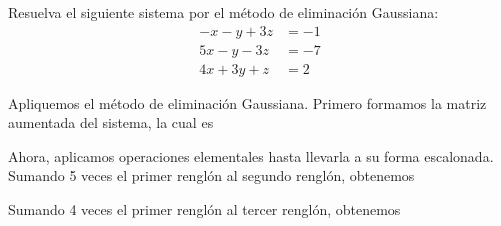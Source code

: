 \begin{examplebox}{}{}
    Resuelva el siguiente sistema por el método de eliminación Gaussiana:
    \begin{align*}
        -x - y + 3z & = -1 \\
        5x - y - 3z & = -7 \\
        4x + 3y + z & = 2
    \end{align*}

    \tcblower
    \solucion Apliquemos el método de eliminación Gaussiana. Primero formamos la matriz aumentada del sistema, la cual es
    \begin{matrizn}
    \end{matrizn}
    Ahora, aplicamos operaciones elementales hasta llevarla a su forma escalonada. Sumando 5 veces el primer renglón al segundo renglón, obtenemos
    \begin{matrizn}
    \end{matrizn}
    Sumando 4 veces el primer renglón al tercer renglón, obtenemos
    \begin{matrizn}

\end{matrizn}
\end{examplebox}
